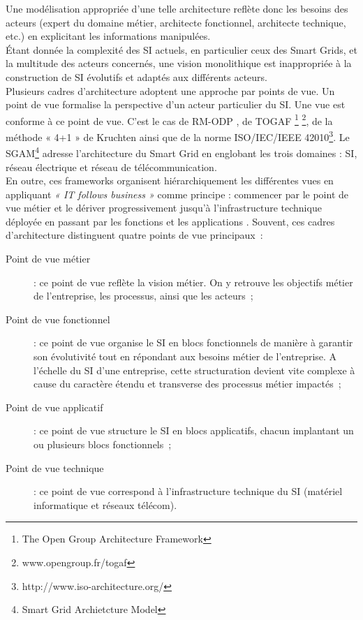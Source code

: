 Une modélisation appropriée d'une telle architecture reflète donc les besoins 
des acteurs (expert du domaine métier, architecte fonctionnel, architecte 
technique, etc.) en explicitant les informations manipulées.  
\\Étant donnée la complexité des SI actuels, en particulier ceux des Smart 
Grids, et la multitude des acteurs concernés, une vision monolithique est 
inappropriée à la construction de SI évolutifs et adaptés aux différents 
acteurs.
\\Plusieurs cadres d'architecture adoptent une approche par points de vue. Un 
point de vue formalise la perspective d'un acteur particulier du SI. Une vue est 
conforme à ce point de vue. C'est le cas de RM-ODP \cite{raymond1995reference}, 
de TOGAF \footnote{The Open Group Architecture Framework} 
\footnote{www.opengroup.fr/togaf}, de la méthode « 4+1 » de Kruchten 
\cite{kruchten19954+} ainsi que de la norme ISO/IEC/IEEE 
42010\footnote{http://www.iso-architecture.org/}. Le SGAM\footnote{Smart Grid 
Archietcture Model} \cite{uslar2012standardization} adresse l'architecture du 
Smart Grid en englobant les trois domaines : SI, réseau électrique et réseau de 
télécommunication. 
\\En outre, ces frameworks organisent hiérarchiquement les différentes vues en 
appliquant \emph{« IT follows business »} comme principe : commencer par le 
point de vue métier et le dériver progressivement jusqu'à l'infrastructure 
technique déployée en passant par les fonctions et les applications 
\cite{winter2006essential}. 
Souvent, ces cadres d'architecture distinguent quatre points de vue principaux~:
\begin{description}
\item[Point de vue métier]  : ce point de vue reflète la vision métier. On y 
retrouve les objectifs métier de l'entreprise, les processus, ainsi que les 
acteurs~;
\item[Point de vue fonctionnel] : ce point de vue organise le SI en blocs 
fonctionnels de manière à garantir son évolutivité tout en répondant aux besoins 
métier de l'entreprise. A l'échelle du SI d'une entreprise, cette structuration 
devient vite complexe à cause du caractère étendu et transverse des processus 
métier impactés~;
\item[Point de vue applicatif] : ce point de vue structure le SI en blocs 
applicatifs, chacun implantant un ou plusieurs blocs fonctionnels~;
\item[Point de vue technique] : ce point de vue correspond à l'infrastructure 
technique du SI (matériel informatique et réseaux télécom).
\end{description}




